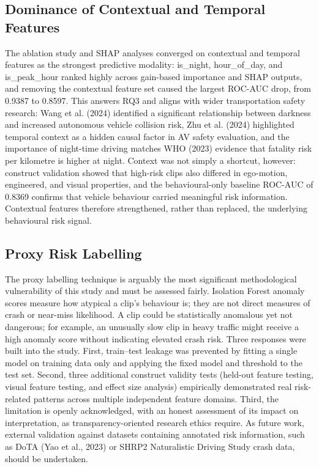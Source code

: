 \documentclass[11pt,a4paper]{article}
\begin{document}
\subsection{Dominance of Contextual and Temporal Features}

The ablation study and SHAP analyses converged on contextual and temporal features as the strongest predictive modality: is\_night, hour\_of\_day, and is\_peak\_hour ranked highly across gain-based importance and SHAP outputs, and removing the contextual feature set caused the largest ROC-AUC drop, from 0.9387 to 0.8597. This answers RQ3 and aligns with wider transportation safety research: Wang et al. (2024) identified a significant relationship between darkness and increased autonomous vehicle collision risk, Zhu et al. (2024) highlighted temporal context as a hidden causal factor in AV safety evaluation, and the importance of night-time driving matches WHO (2023) evidence that fatality risk per kilometre is higher at night. Context was not simply a shortcut, however: construct validation showed that high-risk clips also differed in ego-motion, engineered, and visual properties, and the behavioural-only baseline ROC-AUC of 0.8369 confirms that vehicle behaviour carried meaningful risk information. Contextual features therefore strengthened, rather than replaced, the underlying behavioural risk signal.

\subsection{Proxy Risk Labelling}

The proxy labelling technique is arguably the most significant methodological vulnerability of this study and must be assessed fairly. Isolation Forest anomaly scores measure how atypical a clip's behaviour is; they are not direct measures of crash or near-miss likelihood. A clip could be statistically anomalous yet not dangerous; for example, an unusually slow clip in heavy traffic might receive a high anomaly score without indicating elevated crash risk. Three responses were built into the study. First, train--test leakage was prevented by fitting a single model on training data only and applying the fixed model and threshold to the test set. Second, three additional construct validity tests (held-out feature testing, visual feature testing, and effect size analysis) empirically demonstrated real risk-related patterns across multiple independent feature domains. Third, the limitation is openly acknowledged, with an honest assessment of its impact on interpretation, as transparency-oriented research ethics require. As future work, external validation against datasets containing annotated risk information, such as DoTA (Yao et al., 2023) or SHRP2 Naturalistic Driving Study crash data, should be undertaken.
\end{document}
